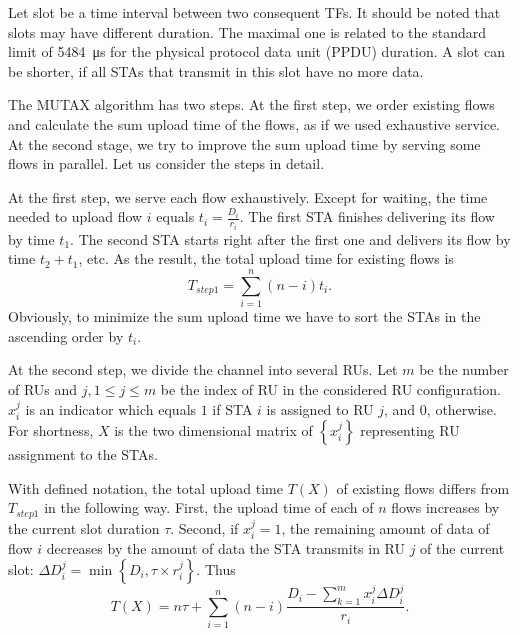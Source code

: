 Let slot be a time interval between two consequent TFs.
It should be noted that slots may have different duration.
The maximal one is related to the standard limit of \SI{5484}{\us} for the physical protocol data unit (PPDU) duration.
A slot can be shorter, if all STAs that transmit in this slot have no more data.

The MUTAX algorithm has two steps. At the first step, we order existing flows and calculate the sum upload time of the flows, as if we used exhaustive service.
At the second stage, we try to improve the sum upload time by serving some flows in parallel.
Let us consider the steps in detail.
  
At the first step, we serve each flow exhaustively.
Except for waiting, the time needed to upload flow $i$ equals $t_i = \frac{D_i}{r_{i}}$. %
The first STA finishes delivering its flow by time $t_1$.
The second STA starts right after the first one and delivers its flow by time $t_2 + t_1$, etc.
As the result, the total upload time for existing flows is
\begin{equation}
T_{step1} = \sum_{i = 1}^{n} \left(n - i\right) t_i. 
\end{equation}
Obviously, to minimize the sum upload time we have to sort the STAs in the ascending order by $t_i$.

At the second step, we divide the channel into several RUs.   
Let $m$ be the number of RUs and $j, 1\le j \le m$ be the index of RU in the considered RU configuration.  
$x_i^j$ is an indicator which equals $1$ if STA $i$ is assigned to RU $j$, and $0$, otherwise.
For shortness, $X$ is the two dimensional matrix of $\left\{x_i^j\right\}$ representing RU assignment to the STAs. 

With defined notation, the total upload time $T\left(X\right) $ of existing flows differs from $T_{step1}$ in the following way. First, the upload time of each of $n$ flows increases by  the current slot duration $\tau$. Second, if $x_i^j=1$, the remaining amount of data of flow $i$ decreases by the amount of data the STA transmits in RU $j$ of the current slot: $\Delta D_i^j = \min\left\{D_i, \tau \times r_{i}^{j}\right\}$. Thus  
\begin{equation}
T\left(X\right) = n \tau + \sum_{i = 1}^{n} \left(n - i\right) \frac{D_i -  \sum_{k = 1}^{m} x_i^j \Delta D_i^j}{r_{i}}.
\end{equation}




